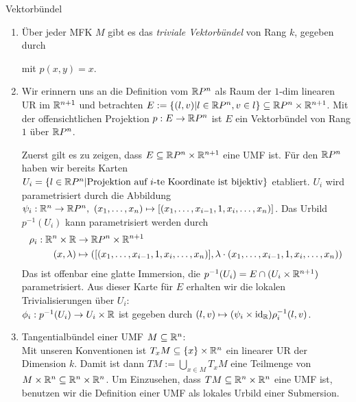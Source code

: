 \begin{beispiele}Vektorbündel\\
\begin{enumerate}
\item Über jeder MFK $M$ gibt es das \textit{triviale Vektorbündel} von Rang $k$, gegeben durch
\begin{center}
\end{center}
mit $p(x, y) =x$.
\item Wir erinnern uns an die Definition vom $\mathbb{R} P^n$ als Raum der $1$-dim linearen UR im $\mathbb{R}^{n+1}$ und betrachten $E:= \{ (l, v) | l \in \mathbb{R} P^n, v \in l \} \subseteq \mathbb{R} P^n \times \mathbb{R}^{n+1}$. Mit der offensichtlichen Projektion $p: E \to  \mathbb{R} P^n$ ist $E$ ein Vektorbündel von Rang $1$ über $\mathbb{R} P^n$.
\begin{beweis}
Zuerst gilt es zu zeigen, dass $E \subseteq \mathbb{R} P^n \times \mathbb{R}^{n+1}$ eine UMF ist. Für den $\mathbb{R} P^n$ haben wir bereits Karten $U_i = \{ l \in \mathbb{R} P^n | \text{Projektion auf} \ i \text{-te Koordinate ist bijektiv}\}$ etabliert. $U_i$ wird parametrisiert durch die Abbildung $\psi_i : \mathbb{R}^n \to \mathbb{R} P^n, \ (x_1, \dots, x_n) \mapsto [(x_1, \dots, x_{i-1}, 1, x_i, \dots, x_n)]$. Das Urbild $p^{-1}(U_i)$ kann parametrisiert werden durch
\begin{align}
\rho_i: \mathbb{R}^n \times \mathbb{R} &\to \mathbb{R} P^n \times \mathbb{R}^{n+1} \\
(x, \lambda) &\mapsto \left( [(x_1, \dots, x_{i-1}, 1, x_i, \dots, x_n)], \lambda \cdot (x_1, \dots, x_{i-1}, 1, x_i, \dots, x_n)\right)
\end{align}
Das ist offenbar eine glatte Immersion, die $p^{-1}(U_i)=E \cap (U_i \times \mathbb{R}^{n+1})$ parametrisiert.
Aus dieser Karte für $E$ erhalten wir die lokalen Trivialisierungen über $U_i$:\\
$\phi_i: p^{-1}(U_i) \to U_i \times \mathbb{R}$ ist gegeben durch $(l, v) \mapsto (\psi_i \times \text{id}_{\mathbb{R}}) \rho_i^{-1}(l,v)$.
\end{beweis}
\item Tangentialbündel einer UMF $M \subseteq \mathbb{R}^n$:\\
Mit unseren Konventionen ist $T_xM \subseteq \{x\} \times \mathbb{R}^n$ ein linearer UR der Dimension $k$. Damit ist dann $TM := \bigcup_{x \in M} T_xM$ eine Teilmenge von $M \times \mathbb{R}^n \subseteq \mathbb{R}^n \times \mathbb{R}^n$. Um Einzusehen, dass $TM \subseteq \mathbb{R}^n \times \mathbb{R}^n$ eine UMF ist, benutzen wir die Definition einer UMF als lokales Urbild einer Submersion.
\begin{beweis}

\end{beweis}
\end{enumerate}
\end{beispiele}
